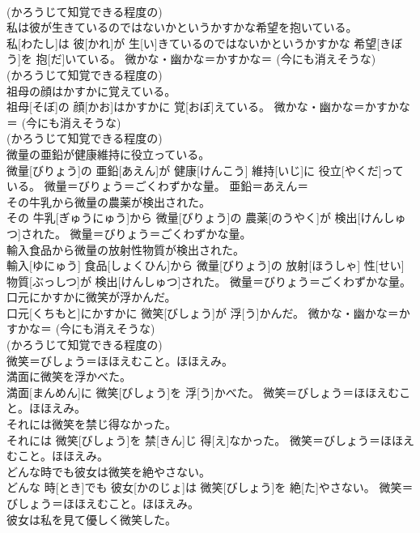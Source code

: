 \documentclass[8pt]{extreport}
\begin{document}
\begin{CJK}{UTF8}{min}
{\\	(かろうじて知覚できる程度の) 
\\	私は彼が生きているのではないかというかすかな希望を抱いている。	
\\	私[わたし]は 彼[かれ]が 生[い]きているのではないかというかすかな 希望[きぼう]を 抱[だ]いている。	微かな・幽かな＝かすかな＝ (今にも消えそうな) 
\\	(かろうじて知覚できる程度の) 
\\	祖母の顔はかすかに覚えている。	
\\	祖母[そぼ]の 顔[かお]はかすかに 覚[おぼ]えている。	微かな・幽かな＝かすかな＝ (今にも消えそうな) 
\\	(かろうじて知覚できる程度の) 
\\	微量の亜鉛が健康維持に役立っている。	
\\	微量[びりょう]の 亜鉛[あえん]が 健康[けんこう] 維持[いじ]に 役立[やくだ]っている。	微量＝びりょう＝ごくわずかな量。 亜鉛＝あえん＝ 
\\	その牛乳から微量の農薬が検出された。	
\\	その 牛乳[ぎゅうにゅう]から 微量[びりょう]の 農薬[のうやく]が 検出[けんしゅつ]された。	微量＝びりょう＝ごくわずかな量。
\\	輸入食品から微量の放射性物質が検出された。	
\\	輸入[ゆにゅう] 食品[しょくひん]から 微量[びりょう]の 放射[ほうしゃ] 性[せい] 物質[ぶっしつ]が 検出[けんしゅつ]された。	微量＝びりょう＝ごくわずかな量。
\\	口元にかすかに微笑が浮かんだ。	
\\	口元[くちもと]にかすかに 微笑[びしょう]が 浮[う]かんだ。	微かな・幽かな＝かすかな＝ (今にも消えそうな) 
\\	(かろうじて知覚できる程度の) 
\\	微笑＝びしょう＝ほほえむこと。ほほえみ。
\\	満面に微笑を浮かべた。	
\\	満面[まんめん]に 微笑[びしょう]を 浮[う]かべた。	微笑＝びしょう＝ほほえむこと。ほほえみ。
\\	それには微笑を禁じ得なかった。	
\\	それには 微笑[びしょう]を 禁[きん]じ 得[え]なかった。	微笑＝びしょう＝ほほえむこと。ほほえみ。
\\	どんな時でも彼女は微笑を絶やさない。	
\\	どんな 時[とき]でも 彼女[かのじょ]は 微笑[びしょう]を 絶[た]やさない。	微笑＝びしょう＝ほほえむこと。ほほえみ。
\\	彼女は私を見て優しく微笑した。	
}
\end{CJK}
\end{document}
